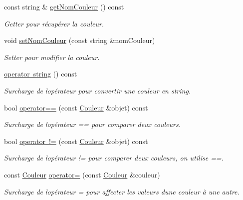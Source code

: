 \begin{DoxyCompactItemize}
const string \& \mbox{\hyperlink{class_couleur_a0e38cc8477e1618b317124ab372c3501}{get\+Nom\+Couleur}} () const
\begin{DoxyCompactList}\small\item\em Getter pour récupérer la couleur. \end{DoxyCompactList}\item 
void \mbox{\hyperlink{class_couleur_a571f1d6faacd4ee99f0180400ccb259d}{set\+Nom\+Couleur}} (const string \&nom\+Couleur)
\begin{DoxyCompactList}\small\item\em Setter pour modifier la couleur. \end{DoxyCompactList}\item 
\mbox{\hyperlink{class_couleur_acff55563e5760e4cea32ca275eb62205}{operator string}} () const
\begin{DoxyCompactList}\small\item\em Surcharge de l\textquotesingle{}opérateur pour convertir une couleur en string. \end{DoxyCompactList}\item 
bool \mbox{\hyperlink{class_couleur_a159c6c550e8855d6a44765ab5e0b0de8}{operator==}} (const \mbox{\hyperlink{class_couleur}{Couleur}} \&objet) const
\begin{DoxyCompactList}\small\item\em Surcharge de l\textquotesingle{}opérateur == pour comparer deux couleurs. \end{DoxyCompactList}\item 
bool \mbox{\hyperlink{class_couleur_ade329eaaf3db16de47b3be59b3c13198}{operator !=}} (const \mbox{\hyperlink{class_couleur}{Couleur}} \&objet) const
\begin{DoxyCompactList}\small\item\em Surcharge de l\textquotesingle{}opérateur != pour comparer deux couleurs, on utilise ==. \end{DoxyCompactList}\item 
const \mbox{\hyperlink{class_couleur}{Couleur}} \mbox{\hyperlink{class_couleur_af49bf608ba98af5f9dfe19fbe2759000}{operator=}} (const \mbox{\hyperlink{class_couleur}{Couleur}} \&couleur)
\begin{DoxyCompactList}\small\item\em Surcharge de l\textquotesingle{}opérateur = pour affecter les valeurs d\textquotesingle{}une couleur à une autre. \end{DoxyCompactList}\end{DoxyCompactItemize}
